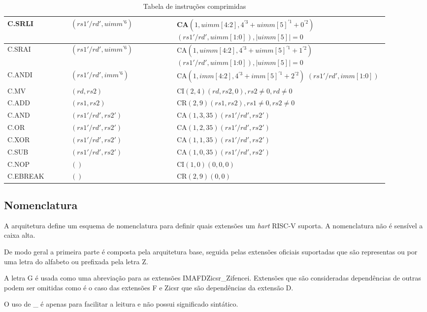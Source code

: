 \begin{table}
\begin{tabular}{ |p{0.15\linewidth}||p{0.25\linewidth}|p{0.5\linewidth}| }
C.SRLI & $(rs1'/rd', uimm^{'6})$ & CA$(1, uimm[4\text{:}2], 4^{'3}+uimm[5]^{'1}+0^{'2})$ $(rs1'/rd', uimm[1\text{:}0]), |uimm[5]| = 0$ \\ \hline
C.SRAI & $(rs1'/rd', uimm^{'6})$ & CA$(1, uimm[4\text{:}2], 4^{'3}+uimm[5]^{'1}+1^{'2})$ $(rs1'/rd', uimm[1\text{:}0]), |uimm[5]| = 0$  \\ \hline
C.ANDI & $(rs1'/rd', imm^{'6})$ & CA$(1, imm[4\text{:}2], 4^{'3}+imm[5]^{'1}+2^{'2})$ $(rs1'/rd', imm[1\text{:}0])$ \\ \hline
C.MV & $(rd, rs2)$ & CI$(2, 4)(rd, rs2, 0), rs2 \neq 0, rd \neq 0$  \\ \hline
C.ADD & $(rs1, rs2)$ & CR$(2, 9)(rs1, rs2), rs1 \neq 0, rs2 \neq 0$ \\ \hline
C.AND & $(rs1'/rd', rs2')$ & CA$(1, 3, 35)(rs1'/rd', rs2')$ \\ \hline
C.OR & $(rs1'/rd', rs2')$ & CA$(1, 2, 35)(rs1'/rd', rs2')$ \\ \hline
C.XOR & $(rs1'/rd', rs2')$ & CA$(1, 1, 35)(rs1'/rd', rs2')$ \\ \hline
C.SUB & $(rs1'/rd', rs2')$ & CA$(1, 0, 35)(rs1'/rd', rs2')$ \\ \hline
C.NOP & $()$ & CI$(1, 0)(0, 0, 0)$ \\ \hline
C.EBREAK & $()$ & CR$(2, 9)(0, 0)$  \\ \hline

    \end{tabular}
  \caption{Tabela de instruções comprimidas \label{tab:c}}
  \end{table}

\subsection{Nomenclatura}
\label{sec:name}

  A arquitetura define um esquema de nomenclatura para definir quais extensões um \emph{hart}
  RISC-V suporta. A nomenclatura não é sensível a caixa alta.

  De modo geral a primeira parte é composta pela arquitetura base, seguida pelas extensões oficiais
  suportadas que são representas ou por uma letra do alfabeto ou prefixada pela letra Z.

  A letra G é usada como uma abreviação para as extensões IMAFDZicsr\_Zifencei. Extensões que 
  são consideradas dependências de outras podem ser omitidas como é o caso das extensões F e Zicsr
  que são dependências da extensão D.

  O uso de \_ é apenas para facilitar a leitura e não possui significado sintático.

